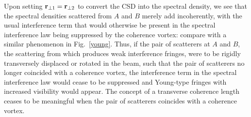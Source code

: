 \documentclass[%
 reprint,
 amsmath,amssymb,
 aps,
]{revtex4-1}
\begin{document}
Upon setting ${\bf r}_{\perp 1}={\bf r}_{\perp 2}$ to convert the CSD into the spectral density, we see that the spectral densities scattered from $A$ and $B$ merely add incoherently, with the usual interference term that would otherwise be present in the spectral interference law \cite{mandel_wolf} being suppressed by the coherence vortex: compare with a similar phenomenon in Fig.~\ref{young}.  Thus, if the pair of scatterers at $A$ and $B$, the scattering from which produces weak interference fringes, were to be rigidly transversely displaced or rotated in the beam, such that the pair of scatterers no longer coincided with a coherence vortex, the interference term in the spectral interference law would cease to be suppressed and Young-type fringes with increased visibility would appear.  The concept of a transverse coherence length ceases to be meaningful when the pair of scatterers coincides with a coherence vortex.     


\end{document}
